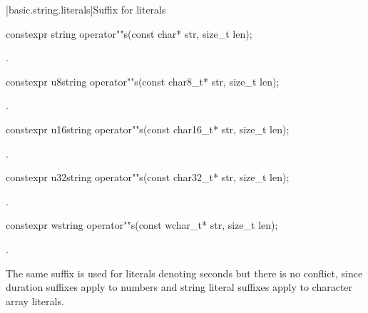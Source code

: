 [basic.string.literals]{Suffix for  literals}

%
\begin{itemdecl}
constexpr string operator""s(const char* str, size_t len);
\end{itemdecl}

\begin{itemdescr}
\pnum
\returns
{}.
\end{itemdescr}

%
\begin{itemdecl}
constexpr u8string operator""s(const char8_t* str, size_t len);
\end{itemdecl}
\begin{itemdescr}
\pnum
\returns
{}.
\end{itemdescr}

%
\begin{itemdecl}
constexpr u16string operator""s(const char16_t* str, size_t len);
\end{itemdecl}
\begin{itemdescr}
\pnum
\returns
{}.
\end{itemdescr}

%
\begin{itemdecl}
constexpr u32string operator""s(const char32_t* str, size_t len);
\end{itemdecl}
\begin{itemdescr}
\pnum
\returns
{}.
\end{itemdescr}

%
\begin{itemdecl}
constexpr wstring operator""s(const wchar_t* str, size_t len);
\end{itemdecl}
\begin{itemdescr}
\pnum
\returns
{}.
\end{itemdescr}

\pnum
\begin{note}
The same suffix  is used for  literals denoting seconds but there is no conflict, since duration suffixes apply to numbers and string literal suffixes apply to character array literals.
\end{note}

